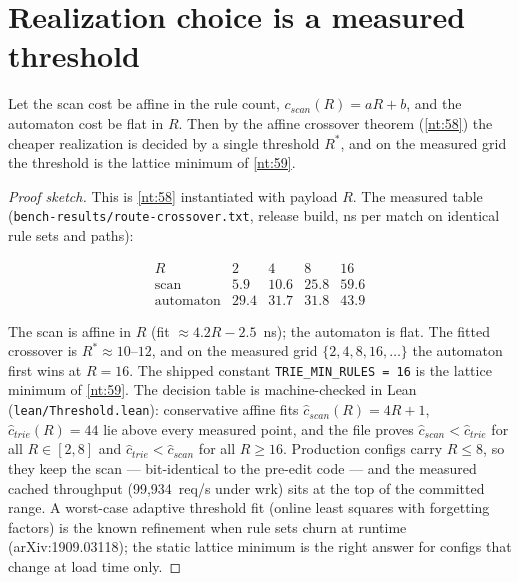 \section{Realization choice is a measured threshold}\label{sec:route-crossover}

\begin{theorem}\label{nt:66}
Let the scan cost be affine in the rule count, $c_{scan}(R) = aR + b$,
and the automaton cost be flat in $R$. Then by the affine crossover
theorem (\autoref{nt:58}) the cheaper realization is decided by a single
threshold $R^\ast$, and on the measured grid the threshold is the
lattice minimum of \autoref{nt:59}.
\end{theorem}

\begin{proof}[Proof sketch]
This is \autoref{nt:58} instantiated with payload $R$. The measured
table (\texttt{bench-results/route-crossover.txt}, release build, ns per
match on identical rule sets and paths):

\[
\begin{array}{l|rrrr}
R & 2 & 4 & 8 & 16\\\hline
\text{scan} & 5.9 & 10.6 & 25.8 & 59.6\\
\text{automaton} & 29.4 & 31.7 & 31.8 & 43.9
\end{array}
\]

The scan is affine in $R$ (fit $\approx 4.2R - 2.5$~ns); the automaton
is flat. The fitted crossover is $R^\ast \approx 10$--$12$, and on the
measured grid $\{2,4,8,16,\ldots\}$ the automaton first wins at
$R = 16$. The shipped constant \texttt{TRIE\_MIN\_RULES = 16} is the
lattice minimum of \autoref{nt:59}. The decision table is machine-checked
in Lean (\texttt{lean/Threshold.lean}): conservative affine fits
$\hat{c}_{scan}(R) = 4R+1$, $\hat{c}_{trie}(R) = 44$ lie above every
measured point, and the file proves $\hat{c}_{scan} < \hat{c}_{trie}$
for all $R \in [2,8]$ and $\hat{c}_{trie} < \hat{c}_{scan}$ for all
$R \ge 16$. Production configs carry $R \le 8$, so they keep the scan ---
bit-identical to the pre-edit code --- and the measured cached throughput
(99{,}934~req/s under wrk) sits at the top of the committed range. A
worst-case adaptive threshold fit (online least squares with forgetting
factors) is the known refinement when rule sets churn at runtime
(arXiv:1909.03118); the static lattice minimum is the right answer for
configs that change at load time only.
\end{proof}

